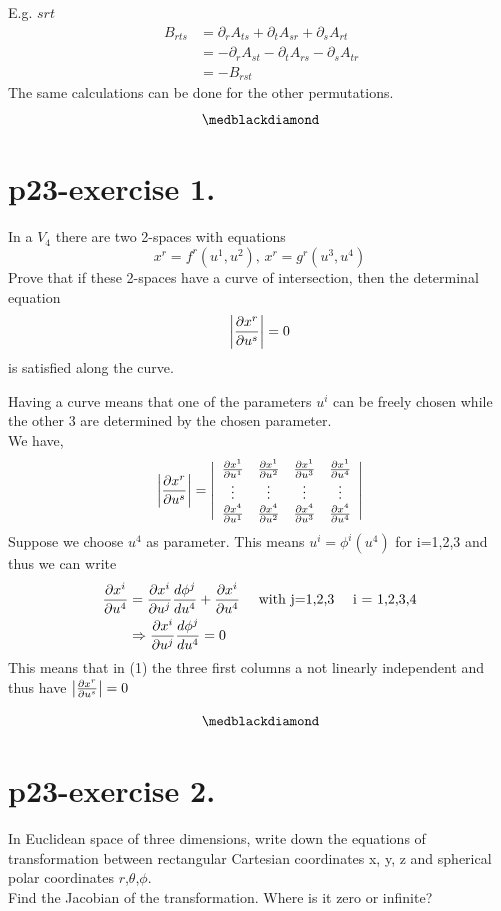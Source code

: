 E.g. $srt$
\begin{align}
\ B_{rts} &= \partial_{r}{A_{ts}}+\partial_{t}{A_{sr}}+\partial_{s}{A_{rt}}\\
&= -\partial_{r}{A_{st}}-\partial_{t}{A_{rs}}-\partial_{s}{A_{tr}}\\
&= - B_{rst}
\end{align}
The same calculations can be done for the other permutations.
$$\medblackdiamond$$
\pagebreak[4]

\section{p23-exercise 1.}
\begin{tcolorbox}
In a $V_{4}$ there are two 2-spaces with equations
$$x^r = f^r(u^1,u^2)\text{, }x^r = g^r(u^3,u^4) $$
Prove that if these 2-spaces have a curve of intersection, then the determinal equation
$$\left|\pdv{x^r}{u^s}\right| = 0$$
is satisfied along the curve.
\end{tcolorbox}
Having a curve means that one of the parameters $u^i$ can be freely chosen while the other 3 are determined by the chosen parameter.\\
We have,
\begin{align}
\left|\pdv{x^r}{u^s}\right| = \left| {\begin{array}{cccc}
    \pdv{x^1}{u^1} & \pdv{x^1}{u^2} & \pdv{x^1}{u^3} & \pdv{x^1}{u^4}\\
    \vdots & \vdots & \vdots & \vdots\\
    \pdv{x^4}{u^1} & \pdv{x^4}{u^2} & \pdv{x^4}{u^3} & \pdv{x^4}{u^4}\\
  \end{array} } \right|
\end{align}
Suppose we choose $u^4$ as parameter.
This means $u^i = \phi^i(u^4)$ for i=1,2,3 and thus we can write
\begin{align}
\pdv{x^i}{u^4} &= \pdv{x^i}{u^j}\dv{\phi^j}{u^4}+ \pdv{x^i}{u^4}\quad\text{ with j=1,2,3} \quad\text{  i = 1,2,3,4}\\
&\Rightarrow \pdv{x^i}{u^j}\dv{\phi^j}{u^4} = 0
\end{align}
This means that in (1) the three first columns a not linearly independent and thus have   $\left|\pdv{x^r}{u^s}\right| = 0$

$$\medblackdiamond$$
\pagebreak[4]

\section{p23-exercise 2.}
\begin{tcolorbox}
In Euclidean space of three dimensions, write down the equations of transformation between rectangular Cartesian coordinates x, y, z and spherical polar coordinates $r$,$\theta$,$\phi$.\\
Find the Jacobian of the transformation. Where is it zero or infinite?
\end{tcolorbox}

